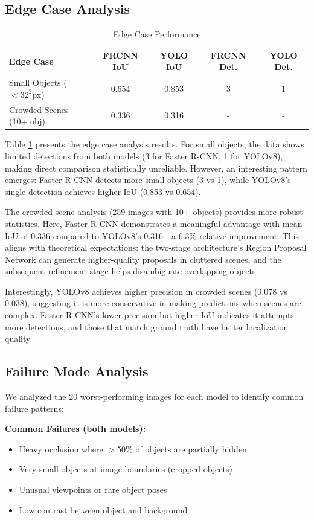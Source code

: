 \documentclass[conference]{IEEEtran}
\begin{document}
\subsection{Edge Case Analysis}

\begin{table}[h]
\centering
\caption{Edge Case Performance}
\label{tab:edgecase}
\begin{tabular}{lcccc}
\toprule
\textbf{Edge Case} & \textbf{FRCNN IoU} & \textbf{YOLO IoU} & \textbf{FRCNN Det.} & \textbf{YOLO Det.} \\
\midrule
Small Objects ($<32^2$px) & 0.654 & 0.853 & 3 & 1 \\
Crowded Scenes (10+ obj) & 0.336 & 0.316 & - & - \\
\bottomrule
\end{tabular}
\end{table}

Table \ref{tab:edgecase} presents the edge case analysis results. For small objects, the data shows limited detections from both models (3 for Faster R-CNN, 1 for YOLOv8), making direct comparison statistically unreliable. However, an interesting pattern emerges: Faster R-CNN detects more small objects (3 vs 1), while YOLOv8's single detection achieves higher IoU (0.853 vs 0.654).

The crowded scene analysis (259 images with 10+ objects) provides more robust statistics. Here, Faster R-CNN demonstrates a meaningful advantage with mean IoU of 0.336 compared to YOLOv8's 0.316---a 6.3\% relative improvement. This aligns with theoretical expectations: the two-stage architecture's Region Proposal Network can generate higher-quality proposals in cluttered scenes, and the subsequent refinement stage helps disambiguate overlapping objects.

Interestingly, YOLOv8 achieves higher precision in crowded scenes (0.078 vs 0.038), suggesting it is more conservative in making predictions when scenes are complex. Faster R-CNN's lower precision but higher IoU indicates it attempts more detections, and those that match ground truth have better localization quality.

\subsection{Failure Mode Analysis}

We analyzed the 20 worst-performing images for each model to identify common failure patterns:

\textbf{Common Failures (both models):}
\begin{itemize}
    \item Heavy occlusion where $>$50\% of objects are partially hidden
    \item Very small objects at image boundaries (cropped objects)
    \item Unusual viewpoints or rare object poses
    \item Low contrast between object and background
\end{itemize}
\end{document}
